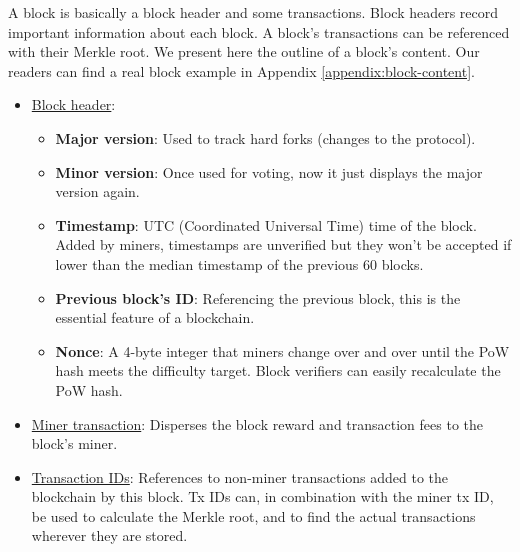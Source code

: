 A block is basically a block header and some transactions. Block headers record important information about each block. A block's transactions can be referenced with their Merkle root. We present here the outline of a block's content. Our readers can find a real block example in Appendix \ref{appendix:block-content}.
\begin{itemize}
    \item \underline{Block header}:
    \begin{itemize}
        \item \textbf{Major version}: Used to track hard forks (changes to the protocol).
        \item \textbf{Minor version}: Once used for voting, now it just displays the major version again.
        \item \textbf{Timestamp}: UTC (Coordinated Universal Time) time of the block. Added by miners, timestamps are unverified but they won't be accepted if lower than the median timestamp of the previous 60 blocks. %
        \item \textbf{Previous block's ID}: Referencing the previous block, this is the essential feature of a blockchain.
        \item \textbf{Nonce}: A 4-byte integer that miners change over and over until the PoW hash meets the difficulty target. Block verifiers can easily recalculate the PoW hash.
    \end{itemize}
    \item \underline{Miner transaction}: Disperses the block reward and transaction fees to the block's miner.
    \item \underline{Transaction IDs}: References to non-miner transactions added to the blockchain by this block. Tx IDs can, in combination with the miner tx ID, be used to calculate the Merkle root, and to find the actual transactions wherever they are stored.\\
\end{itemize}\vspace{.05cm}

